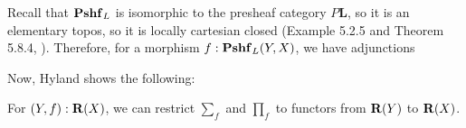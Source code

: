 Recall that $ \mathbf{Pshf}_{L} $ is isomorphic to the presheaf category $ P \mathbf L $, so it is an elementary topos, so it is locally cartesian closed (Example 5.2.5 and Theorem 5.8.4, \cite{borceux-3}). Therefore, for a morphism $ f: \mathbf{Pshf}_{L}(Y, X) $, we have adjunctions
\begin{center}
\end{center}

Now, Hyland shows the following:
\begin{theorem}\label{thm:restrict-sum-product}
  For $ (Y, f) : \mathbf{R}(X) $, we can restrict $ \sum_f $ and $ \prod_f $ to functors from $ \mathbf{R}(Y) $ to $ \mathbf{R}(X) $.
\end{theorem}
